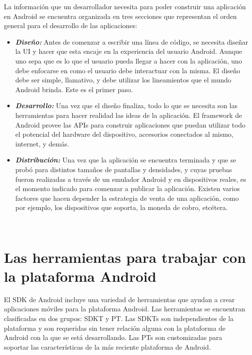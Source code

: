 La informaci\'on que un desarrollador necesita para poder construir una aplicaci\'on en Android se encuentra organizada en tres secciones que representan el orden general para el desarrollo de las aplicaciones:

\begin{itemize}
\item \textbf{\textit{Dise\~no:}} Antes de comenzar a escribir una l\'inea de c\'odigo, se necesita dise\~nar la \ac{UI} y hacer que esta encaje en la experiencia del usuario Android. Aunque uno sepa que es lo que el usuario pueda llegar a hacer con la aplicaci\'on, uno debe enfocarse en como el usuario debe interactuar con la misma. El dise\~no debe ser simple, llamativo, y debe utilizar los lineamientos que el mundo Android brinda. Este es el primer paso.

\item \textbf{\textit{Desarrollo:}} Una vez que el dise\~no finaliza, todo lo que se necesita son las herramientas para hacer realidad las ideas de la aplicaci\'on. El framework de Android provee las \ac{API}s para construir aplicaciones que puedan utilizar todo el potencial del hardware del dispositivo, accesorios conectados al mismo, internet, y dem\'as. 

\item \textbf{\textit{Distribuci\'on:}} Una vez que la aplicaci\'on se encuentra terminada y que se prob\'o para distintos tama\~nos de pantallas y densidades, y cuyas pruebas fueron realizadas a trav\'es de un emulador Android y en dispositivos reales, es el momento indicado para comenzar a publicar la aplicaci\'on. Existen varios factores que hacen depender la estrategia de venta de una aplicaci\'on, como por ejemplo, los dispositivos que soporta, la moneda de cobro, etc\'etera.
\end{itemize}~\cite{and.dev.sdk}


\section{Las herramientas para trabajar con la plataforma Android}
\label{sec:android.tools.1}

El \ac{SDK} de Android incluye una variedad de herramientas que ayudan a crear aplicaciones m\'oviles para la plataforma Android. Las herramientas se encuentran clasificadas en dos grupos: \ac{SDKT} y \ac{PT}. Las \ac{SDKT}s  son independientes de la plataforma y son requeridas sin tener relaci\'on alguna con la plataforma de Android con la que se est\'a desarrollando. Las \ac{PT}s son customizadas para soportar las caracter\'isticas de la m\'as reciente plataforma de Android.

